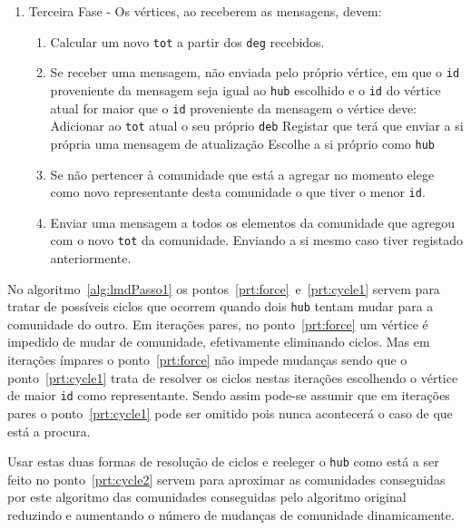 \begin{algorithm}
\begin{minipage}{\textwidth}
\begin{enumerate}
  \item Terceira Fase - Os vértices, ao receberem as mensagens, devem:
\begin{enumerate}
		\item Calcular um novo \verb|tot| a partir dos \verb|deg| recebidos.
		\label{prt:cycle1}
		\item Se receber uma mensagem, não enviada pelo próprio vértice, em que o \verb|id| proveniente da mensagem seja igual ao \verb|hub| escolhido e o \verb|id| do vértice atual for maior que o \verb|id| proveniente da mensagem o vértice deve:
				\subitem Adicionar ao \verb|tot| atual o seu próprio \verb|deb|
				\subitem Registar que terá que enviar a si própria uma mensagem de atualização
				\subitem Escolhe a si próprio como \verb|hub|
		\label{prt:cycle2}
		\item Se não pertencer à comunidade que está a agregar no momento elege como novo representante desta comunidade o que tiver o menor \verb|id|.
		\label{prt:same}
		\item Enviar uma mensagem a todos os elementos da comunidade que agregou com o novo \verb|tot| da comunidade. Enviando a si mesmo caso tiver registado anteriormente.
\end{enumerate}
\end{enumerate}

	\end{minipage}
\end{algorithm}

No algoritmo~\ref{alg:lmdPasso1} os pontos~\ref{prt:force}~e~\ref{prt:cycle1} servem para tratar de possíveis ciclos que ocorrem quando dois \verb|hub| tentam mudar para a comunidade do outro.
Em iterações pares, no ponto~\ref{prt:force} um vértice é impedido de mudar de comunidade, efetivamente eliminando ciclos.
Mas em iterações ímpares o ponto~\ref{prt:force} não impede mudanças sendo que o ponto~\ref{prt:cycle1} trata de resolver os ciclos nestas iterações escolhendo o vértice de maior \verb|id| como representante.
Sendo assim pode-se assumir que em iterações pares o ponto~\ref{prt:cycle1} pode ser omitido pois nunca acontecerá o caso de que está a procura.

Usar estas duas formas de resolução de ciclos e reeleger o \verb|hub| como está a ser feito no ponto~\ref{prt:cycle2} servem para aproximar as comunidades conseguidas por este algoritmo das comunidades conseguidas pelo algoritmo original reduzindo e aumentando o número de mudanças de comunidade dinamicamente.


